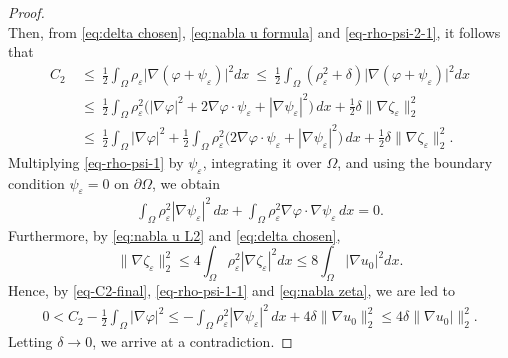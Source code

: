 \documentclass[10pt,a4paper]{amsart}
\newcommand{\Om}{{\Omega}}
\newcommand{\ve}{{\varepsilon}}
\begin{document}
\begin{proof}
\begin{equation}
\end{equation}
Then,  from   \eqref{eq:delta chosen},  \eqref{eq:nabla u formula} and \eqref{eq-rho-psi-2-1}, it follows that
\begin{equation}\label{eq-C2-final}
\begin{aligned}
C_2 ~&\le ~   \frac12
\int_\Omega\rho_\ve \big| \nabla (\varphi + \psi_\varepsilon )\big|^2 dx
 ~ \leq~   \frac12   \int_\Omega (\rho_\varepsilon^2+\delta)  \big| \nabla (\varphi + \psi_\varepsilon )\big|^2  dx \\
&  \le ~   \frac12   \int_\Omega  \rho_\varepsilon^2   \big( | \nabla  \varphi |^2 +2 \nabla  \varphi \cdot  \psi_\varepsilon +|\nabla \psi_\varepsilon|^2  \big)\,  dx + \frac12 \delta    \| \nabla \zeta_\ve \|_2^2 \\
&  \le ~  \frac12   \int_\Omega     | \nabla  \varphi |^2 +\frac12   \int_\Omega  \rho_\varepsilon^2   \big(2 \nabla  \varphi \cdot  \psi_\varepsilon +|\nabla \psi_\varepsilon|^2  \big)\,  dx  +   \frac12 \delta    \| \nabla \zeta_\ve \|_2^2 .
\end{aligned}
\end{equation}
Multiplying \eqref{eq-rho-psi-1} by \( \psi_\varepsilon \), integrating it over \( \Omega \), and using the boundary condition \( \psi_\varepsilon = 0 \) on \( \partial\Omega \), we obtain
\begin{align}\label{eq-rho-psi-1-1}
  \int_\Omega \rho_\varepsilon^2 \left| \nabla \psi_\varepsilon \right|^2 \, dx  +\int_\Omega \rho_\varepsilon^2 \nabla \varphi \cdot \nabla \psi_\varepsilon \, dx =0.
\end{align}
Furthermore, by \eqref{eq:nabla u L2} and \eqref{eq:delta chosen},
\begin{equation}\label{eq:nabla zeta}
   \| \nabla \zeta_\ve \|_2^2 \le 4 \int_\Om \rho_\ve^2 | \nabla \zeta_\ve|^2 dx \le 8 \int_\Om |\nabla u_0|^2 dx.
\end{equation}
Hence, by   \eqref{eq-C2-final},  \eqref{eq-rho-psi-1-1} and \eqref{eq:nabla zeta}, we are led to
\begin{align*}
 0< C_2 -   \frac12   \int_\Omega     | \nabla  \varphi |^2 \le   -   \int_\Omega \rho_\varepsilon^2 \left| \nabla \psi_\varepsilon \right|^2 \, dx+  4 \delta  \|\nabla u_0 \|_2^2 \le   4 \delta   \|\nabla u_0|\|_2^2.
\end{align*}
Letting $\delta \to 0$, we arrive at  a contradiction.
\end{proof}
\end{document}
